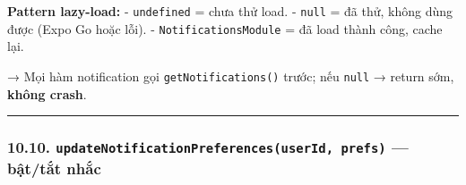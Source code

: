 \documentclass[12pt,a4paper]{article}
\newenvironment{Shaded}{%
  \VerbatimEnvironment
  \begin{quote}\small\ttfamily
}{%
  \end{quote}%
}
\begin{document}
\begin{Shaded}
\begin{Highlighting}[]
\OperatorTok{=} \OperatorTok{===}\OperatorTok{;}

  \NormalTok{()}\OperatorTok{:} \OperatorTok{\textless{}}\OperatorTok{|} \OperatorTok{\textgreater{}}\NormalTok{ \{}
   \OperatorTok{;}  

  \OperatorTok{===} \NormalTok{) \{}
    \NormalTok{ \{}
\OperatorTok{=}  \NormalTok{(}\NormalTok{)}\OperatorTok{;}  
\NormalTok{(\{ }\NormalTok{ \})}\OperatorTok{;}
\NormalTok{    \} }\NormalTok{ \{}
\OperatorTok{=} \OperatorTok{;}
\NormalTok{    \}}
\NormalTok{  \}}
  \OperatorTok{;}
\NormalTok{\}}
\end{Highlighting}
\end{Shaded}

\textbf{Pattern lazy-load:} - \texttt{undefined} = chưa thử load. -
\texttt{null} = đã thử, không dùng được (Expo Go hoặc lỗi). -
\texttt{NotificationsModule} = đã load thành công, cache lại.

→ Mọi hàm notification gọi \texttt{getNotifications()} trước; nếu
\texttt{null} → return sớm, \textbf{không crash}.

\begin{center}\rule{0.5\linewidth}{0.5pt}\end{center}

\subsubsection{\texorpdfstring{10.10.
\texttt{updateNotificationPreferences(userId,\ prefs)} --- bật/tắt
nhắc}{10.10. updateNotificationPreferences(userId, prefs) --- bật/tắt nhắc}}\label{updatenotificationpreferencesuserid-prefs-bux1eadttux1eaft-nhux1eafc}
\end{document}
